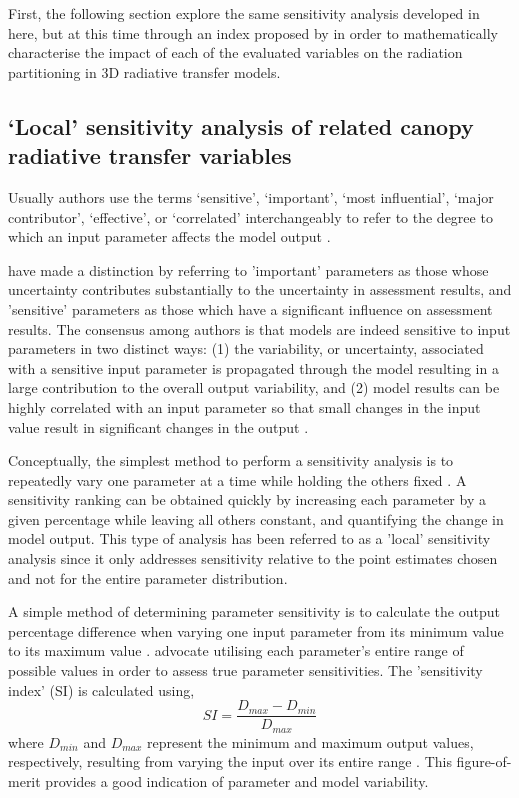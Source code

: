 First, the following section explore the same sensitivity analysis developed in here, but at this time through an index proposed by \citet{Hoffman1983} in order to mathematically characterise the impact of each of the evaluated variables on the radiation partitioning in 3D radiative transfer models. 

\subsection{`Local' sensitivity analysis of related canopy radiative transfer variables}
Usually authors \citep{Downing1985,Iman1988} use the terms `sensitive', `important', `most influential', `major contributor', `effective', or `correlated' interchangeably to refer to the degree to which an input parameter affects the model output \citep{Hamby1994}.

\citet{Crick1987} have made a distinction by referring to 'important' parameters as those whose uncertainty contributes substantially to the uncertainty in assessment results, and 'sensitive' parameters as those which have a significant influence on assessment results. The consensus among authors is that models are indeed sensitive to input parameters in two distinct ways: (1) the variability, or uncertainty, associated with a sensitive input parameter is propagated through the model resulting in a large contribution to the overall output variability, and (2) model results can be highly correlated with an input parameter so that small changes in the input value result in significant changes in the output \citep{Hamby1994}.

Conceptually, the simplest method to perform a sensitivity analysis is to repeatedly vary one parameter at a time while holding the others fixed \citep{Downing1985,Crick1987}. A sensitivity ranking can be obtained quickly by increasing each parameter by a given percentage while leaving all others constant, and quantifying the change in model output. This type of analysis has been referred to as a 'local' sensitivity analysis \citep{Crick1987} since it only addresses sensitivity relative to the point estimates chosen and not for the entire parameter distribution. 

A simple method of determining parameter sensitivity is to calculate the output percentage difference when varying one input parameter from its minimum value to its maximum value \citep{Hoffman1983,Bauer1991}. \citet{Hoffman1983} advocate utilising each parameter's entire range of possible values in order to assess true parameter sensitivities. The 'sensitivity index' (SI) is calculated using,
\begin{equation}
SI = \frac{D_{max}-D_{min}}{D_{max}}
\label{equation:si}
\end{equation}
\noindent where $D_{min}$ and $D_{max}$ represent the minimum and maximum output values, respectively, resulting from varying the input over its entire range \citep{Hoffman1983}. This figure-of-merit provides a good indication of parameter and model variability.

